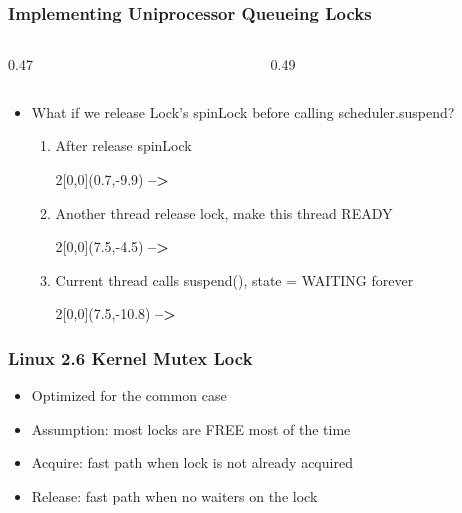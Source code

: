 \documentclass[mathserif,serif,14pt,aspectratio=169]{beamer}
\begin{document}
\begin{frame} [fragile]
	\frametitle{Implementing Uniprocessor Queueing Locks}
	{
	\fontsize{7}{7}\selectfont
	\begin{columns}
		\begin{column}{0.47\textwidth}
		
		\end{column}
		\begin{column}{0.49\textwidth}
		
		\end{column}
	\end{columns}
	}
	{
	\fontsize{12}{12}\selectfont
	\begin{itemize}
	\item<1-> What if we release Lock's spinLock before calling scheduler.suspend?
		\begin{enumerate}
		\fontsize{10}{10}\selectfont
		\item<2-> After release spinLock
			\begin{textblock}{2}[0,0](0.7,-9.9)
				{\color{red} \textbf{-->}}	%
			\end{textblock}
		\item<3-> Another thread release lock, make this thread READY
			\begin{textblock}{2}[0,0](7.5,-4.5)
				{\color{red} \textbf{-->}}	%
			\end{textblock}
		\item<4-> Current thread calls suspend(), state = WAITING forever
			\begin{textblock}{2}[0,0](7.5,-10.8)
				{\color{red} \textbf{-->}}	%
			\end{textblock}
		\end{enumerate}
	\end{itemize}
	}
\end{frame}

\begin{frame} [fragile]
	\frametitle{Linux 2.6 Kernel Mutex Lock}
	\begin{itemize}\setlength\itemsep{0.5em}
	\item<1-> Optimized for the common case
	\item<1-> Assumption: most locks are FREE most of the time
	\item<2-> Acquire: fast path when lock is not already acquired
	\item<3-> Release: fast path when no waiters on the lock
	\end{itemize}
\end{frame}
\end{document}
